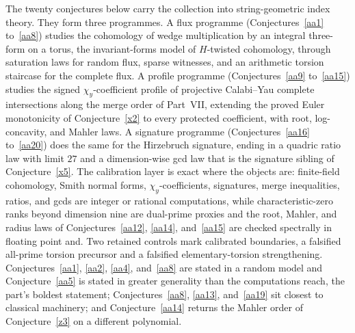 \documentclass[11pt]{article}
\theoremstyle{definition}
\begin{document}
The twenty conjectures below carry the collection into string-geometric index theory.  They form three programmes.  A flux programme (Conjectures~\ref{aa1} to~\ref{aa8}) studies the cohomology of wedge multiplication by an integral three-form on a torus, the invariant-forms model of $H$-twisted cohomology, through saturation laws for random flux, sparse witnesses, and an arithmetic torsion staircase for the complete flux.  A profile programme (Conjectures~\ref{aa9} to~\ref{aa15}) studies the signed $\chi_y$-coefficient profile of projective Calabi--Yau complete intersections along the merge order of Part~VII, extending the proved Euler monotonicity of Conjecture~\ref{x2} to every protected coefficient, with root, log-concavity, and Mahler laws.  A signature programme (Conjectures~\ref{aa16} to~\ref{aa20}) does the same for the Hirzebruch signature, ending in a quadric ratio law with limit $27$ and a dimension-wise gcd law that is the signature sibling of Conjecture~\ref{x5}.  The calibration layer is exact where the objects are: finite-field cohomology, Smith normal forms, $\chi_y$-coefficients, signatures, merge inequalities, ratios, and gcds are integer or rational computations, while characteristic-zero ranks beyond dimension nine are dual-prime proxies and the root, Mahler, and radius laws of Conjectures~\ref{aa12}, \ref{aa14}, and~\ref{aa15} are checked spectrally in floating point and.  Two retained controls mark calibrated boundaries, a falsified all-prime torsion precursor and a falsified elementary-torsion strengthening.  Conjectures~\ref{aa1}, \ref{aa2}, \ref{aa4}, and~\ref{aa8} are stated in a random model and Conjecture~\ref{aa5} is stated in greater generality than the computations reach, the part's boldest statement; Conjectures~\ref{aa8}, \ref{aa13}, and~\ref{aa19} sit closest to classical machinery; and Conjecture~\ref{aa14} returns the Mahler order of Conjecture~\ref{z3} on a different polynomial.
\end{document}
